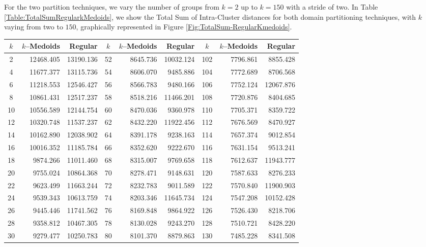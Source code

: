 For the two partition techniques, we vary the number of groups from $k=2$ up to $k=150$ with a stride of two. In Table \ref{Table:TotalSumRegularkMedoids}, we show the Total Sum of Intra-Cluster distances for both domain partitioning techniques, with $k$ vaying from two to $150$, graphically represented in Figure \ref{Fig:TotalSum-RegularKmedoids}. 
\begin{table}[h]
	\centering
	\tiny
	\begin{tabular}{|c|r|r|c|r|r|c|r|r|}
		\hline
		$k$  & $k$--Medoids & Regular & $k$ & $k$--Medoids & Regular & $k$ & $k$--Medoids & Regular \\ \hline
		2  & 12468.405 & 13190.136 &  52 & 8645.736 & 10032.124 & 102 & 7796.861 &  8855.428 \\
		4  & 11677.377 & 13115.736 &  54 & 8606.070 &  9485.886 & 104 & 7772.689 &  8706.568 \\
		6  & 11218.553 & 12546.427 &  56 & 8566.783 &  9480.166 & 106 & 7752.124 & 12067.876 \\
		8  & 10861.431 & 12517.237 &  58 & 8518.216 & 11466.201 & 108 & 7720.876 &  8404.685 \\
		10 & 10556.589 & 12144.754 &  60 & 8470.036 &  9360.978 & 110 & 7705.371 &  8359.722 \\
		12 & 10320.748 & 11537.237 &  62 & 8432.220 & 11922.456 & 112 & 7676.569 &  8470.927 \\
		14 & 10162.890 & 12038.902 &  64 & 8391.178 &  9238.163 & 114 & 7657.374 &  9012.854 \\
		16 & 10016.352 & 11185.784 &  66 & 8352.620 &  9222.670 & 116 & 7631.154 &  9513.241 \\
		18 &  9874.266 & 11011.460 &  68 & 8315.007 &  9769.658 & 118 & 7612.637 & 11943.777 \\
		20 &  9755.024 & 10864.368 &  70 & 8278.471 &  9148.631 & 120 & 7587.633 &  8276.233 \\
		22 &  9623.499 & 11663.244 &  72 & 8232.783 &  9011.589 & 122 & 7570.840 & 11900.903 \\
		24 &  9539.343 & 10613.759 &  74 & 8203.346 & 11645.734 & 124 & 7547.208 & 10152.428 \\
		26 &  9445.446 & 11741.562 &  76 & 8169.848 &  9864.922 & 126 & 7526.430 &  8218.706 \\
		28 &  9358.812 & 10467.305 &  78 & 8130.028 &  9243.270 & 128 & 7510.721 &  8428.220 \\
		30 &  9279.477 & 10250.783 &  80 & 8101.370 &  8879.863 & 130 & 7485.228 &  8341.508 \\

\end{tabular}
\end{table}
